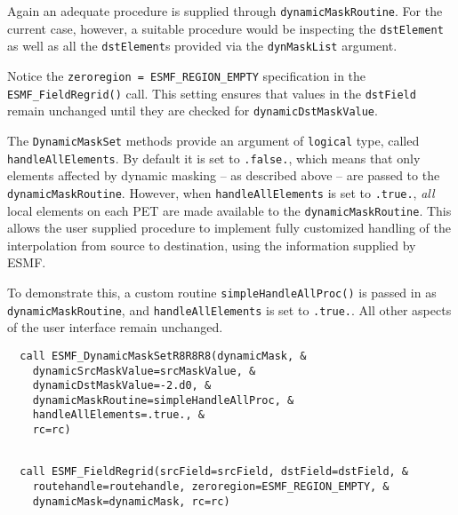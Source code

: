 
   Again an adequate procedure is supplied through 
   {\tt dynamicMaskRoutine}. For the current case, however, a suitable procedure
   would be inspecting the {\tt dstElement} as well as all the {\tt dstElement}s
   provided via the {\tt dynMaskList} argument.
  
   Notice the {\tt zeroregion = ESMF\_REGION\_EMPTY} specification in the 
   {\tt ESMF\_FieldRegrid()} call. This setting ensures that values in the
   {\tt dstField} remain unchanged until they are checked for
   {\tt dynamicDstMaskValue}.  

   The {\tt DynamicMaskSet} methods provide an argument of {\tt logical} type, 
   called {\tt handleAllElements}. By default it is set to {\tt .false.}, 
   which means that only elements affected by dynamic masking -- as described
   above -- are passed to the {\tt dynamicMaskRoutine}. However, when
   {\tt handleAllElements} is set to {\tt .true.}, {\em all} local
   elements on each PET are made available to the {\tt dynamicMaskRoutine}.
   This allows the user supplied procedure to implement fully customized
   handling of the interpolation from source to destination, using the 
   information supplied by ESMF.
  
   To demonstrate this, a custom routine {\tt simpleHandleAllProc()} is 
   passed in as {\tt dynamicMaskRoutine}, and {\tt handleAllElements} is
   set to {\tt .true.}. All other aspects of the user interface remain unchanged. 

 \begin{verbatim}
  call ESMF_DynamicMaskSetR8R8R8(dynamicMask, &
    dynamicSrcMaskValue=srcMaskValue, &
    dynamicDstMaskValue=-2.d0, &
    dynamicMaskRoutine=simpleHandleAllProc, &
    handleAllElements=.true., &
    rc=rc)
 
\end{verbatim}
 

 \begin{verbatim}
  call ESMF_FieldRegrid(srcField=srcField, dstField=dstField, &
    routehandle=routehandle, zeroregion=ESMF_REGION_EMPTY, &
    dynamicMask=dynamicMask, rc=rc)
 
\end{verbatim}
 
